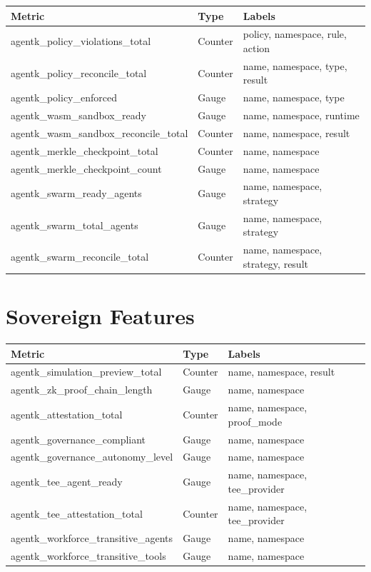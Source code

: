 \documentclass[12pt,a4paper,openany]{report}
\begin{document}
\begin{longtable}{p{6cm}p{2cm}p{5cm}}
\toprule
\textbf{Metric} & \textbf{Type} & \textbf{Labels} \\
\midrule
agentk\_policy\_violations\_total & Counter & policy, namespace, rule, action \\
agentk\_policy\_reconcile\_total & Counter & name, namespace, type, result \\
agentk\_policy\_enforced & Gauge & name, namespace, type \\
agentk\_wasm\_sandbox\_ready & Gauge & name, namespace, runtime \\
agentk\_wasm\_sandbox\_reconcile\_total & Counter & name, namespace, result \\
agentk\_merkle\_checkpoint\_total & Counter & name, namespace \\
agentk\_merkle\_checkpoint\_count & Gauge & name, namespace \\
agentk\_swarm\_ready\_agents & Gauge & name, namespace, strategy \\
agentk\_swarm\_total\_agents & Gauge & name, namespace, strategy \\
agentk\_swarm\_reconcile\_total & Counter & name, namespace, strategy, result \\
\bottomrule
\end{longtable}

\section{Sovereign Features}

\begin{longtable}{p{6cm}p{2cm}p{5cm}}
\toprule
\textbf{Metric} & \textbf{Type} & \textbf{Labels} \\
\midrule
agentk\_simulation\_preview\_total & Counter & name, namespace, result \\
agentk\_zk\_proof\_chain\_length & Gauge & name, namespace \\
agentk\_attestation\_total & Counter & name, namespace, proof\_mode \\
agentk\_governance\_compliant & Gauge & name, namespace \\
agentk\_governance\_autonomy\_level & Gauge & name, namespace \\
agentk\_tee\_agent\_ready & Gauge & name, namespace, tee\_provider \\
agentk\_tee\_attestation\_total & Counter & name, namespace, tee\_provider \\
agentk\_workforce\_transitive\_agents & Gauge & name, namespace \\
agentk\_workforce\_transitive\_tools & Gauge & name, namespace \\
\bottomrule
\end{longtable}
\end{document}
